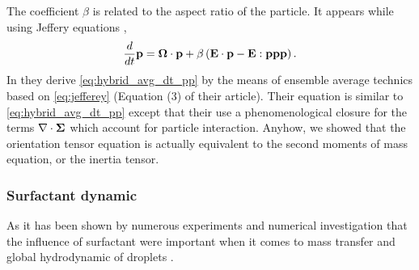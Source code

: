 The coefficient $\beta$  is related to the aspect ratio of the particle. 
It appears while using Jeffery equations \citep{guazzelli2011}, 
\begin{equation}
    \frac{d}{d t} \textbf{p} 
    = \mathbf{\Omega}\cdot\textbf{p}
    + \beta\left(
        \textbf{E}\cdot \textbf{p}
        - \textbf{E} : \textbf{ppp}
    \right).
    \label{eq:jefferey}
\end{equation}
In \citet{wang2008objective} they derive \ref{eq:hybrid_avg_dt_pp} by the means of ensemble average technics based on \ref{eq:jefferey} (Equation (3) of their article). 
Their equation is similar to \ref{eq:hybrid_avg_dt_pp} except that their use a phenomenological closure for the terms $\mathbf{\nabla} \cdot \mathbf{\Sigma}$ which account for particle interaction. 
Anyhow, we showed that the orientation tensor equation is actually equivalent to the second moments of mass equation, or the inertia tensor. 


\subsubsection*{Surfactant dynamic}

As it has been shown by numerous experiments and numerical investigation that the influence of surfactant were important when it comes to mass transfer and global hydrodynamic of droplets \citep{pesci2018computational}. 


